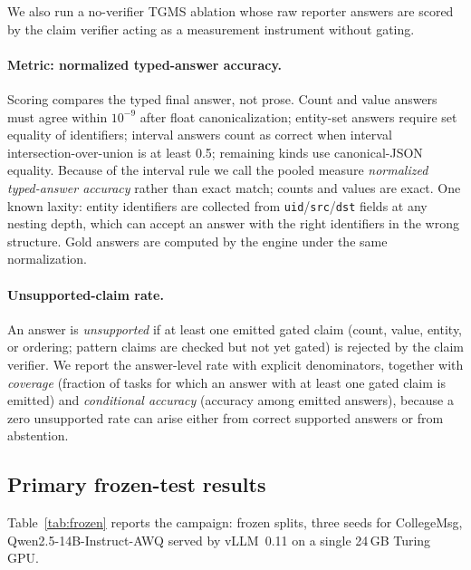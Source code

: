 \documentclass[11pt]{article}
\begin{document}
We also run a no-verifier TGMS ablation whose raw reporter answers are
scored by the claim verifier acting as a measurement instrument without
gating.

\paragraph{Metric: normalized typed-answer accuracy.}
Scoring compares the typed final answer, not prose. Count and value
answers must agree within $10^{-9}$ after float canonicalization;
entity-set answers require set equality of identifiers; interval
answers count as correct when interval intersection-over-union is at
least 0.5; remaining kinds use canonical-JSON equality. Because of the
interval rule we call the pooled measure \emph{normalized typed-answer
accuracy} rather than exact match; counts and values are exact.
One known laxity: entity identifiers are collected from
\texttt{uid}/\texttt{src}/\texttt{dst} fields at any nesting depth,
which can accept an answer with the right identifiers in the wrong
structure. Gold answers are computed by the engine under the same
normalization.

\paragraph{Unsupported-claim rate.}
An answer is \emph{unsupported} if at least one emitted gated claim
(count, value, entity, or ordering; pattern claims are checked but not
yet gated) is rejected by the claim verifier. We report the
answer-level rate with explicit denominators, together with
\emph{coverage} (fraction of tasks for which an answer with at least
one gated claim is emitted) and \emph{conditional accuracy} (accuracy
among emitted answers), because a zero unsupported rate can arise
either from correct supported answers or from abstention.

\subsection{Primary frozen-test results}
\label{sec:frozen}
Table~\ref{tab:frozen} reports the campaign: frozen splits, three seeds
for CollegeMsg, Qwen2.5-14B-Instruct-AWQ served by vLLM~0.11 on a
single 24\,GB Turing GPU.
\end{document}
